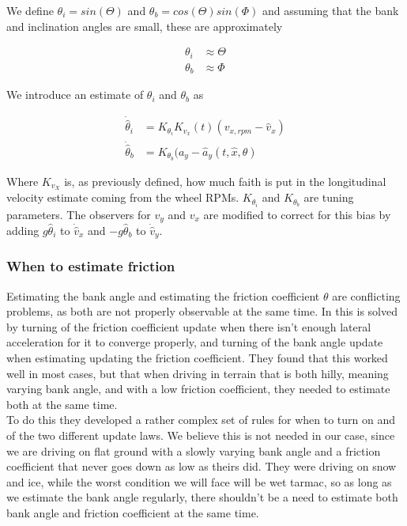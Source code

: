 We define $\theta_i = sin(\Theta)$ and $\theta_b = cos(\Theta)sin(\Phi)$ and assuming that the bank and inclination angles are small, these are approximately 

\begin{align}
    \theta_i & \approx \Theta \\
    \theta_b & \approx \Phi
\end{align}

We introduce an estimate of $\theta_i$ and $\theta_b$ as

\begin{align}
    \dot{\hat{\theta}}_i & = K_{\theta_i}K_{v_x}(t)(v_{x,rpm} - \hat{v}_x) \\
    \dot{\hat{\theta}}_b & = K_{\theta_b}(a_y-\hat{a}_y(t,\hat{x},\theta)
\end{align}

Where $K_{v_X}$ is, as previously defined, how much faith is put in the longitudinal velocity estimate coming from the wheel RPMs. $K_{\theta_i}$ and $K_{\theta_b}$ are tuning parameters. The observers for $v_y$ and $v_x$ are modified to correct for this bias by adding $g\hat{\theta}_i$ to $\dot{\hat{v}}_x$ and $-g\hat{\theta}_b$ to $\dot{\hat{v}}_y$. 

\subsubsection{When to estimate friction}

Estimating the bank angle and estimating the friction coefficient $\theta$ are conflicting problems, as both are not properly observable at the same time. In \cite{MainStateEst} this is solved by turning of the friction coefficient update when there isn't enough lateral acceleration for it to converge properly, and turning of the bank angle update when estimating updating the friction coefficient. They found that this worked well in most cases, but that when driving in terrain that is both hilly, meaning varying bank angle, and with a low friction coefficient, they needed to estimate both at the same time. \\

To do this they developed a rather complex set of rules for when to turn on and of the two different update laws. We believe this is not needed in our case, since we are driving on flat ground with a slowly varying bank angle and a friction coefficient that never goes down as low as theirs did. They were driving on snow and ice, while the worst condition we will face will be wet tarmac, so as long as we estimate the bank angle regularly, there shouldn't be a need to estimate both bank angle and friction coefficient at the same time. \\

